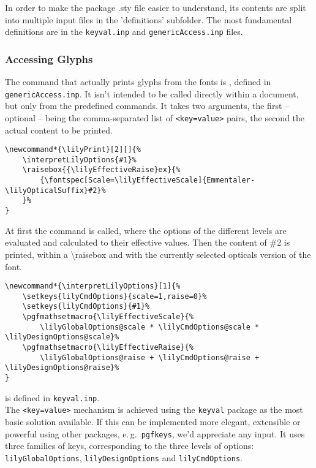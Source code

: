 \documentclass{article}
\begin{document}
\medskip
In order to make the package .sty file easier to understand, its contents are split into multiple input files in the 'definitions' subfolder. 
The most fundamental definitions are in the \texttt{keyval.inp} and \texttt{genericAccess.inp} files.

\subsubsection{Accessing \emmentaler Glyphs}
\label{subsubsec:accessing_emmentaler_glyphs}
The command that actually prints glyphs from the \emmentaler fonts is , defined in \texttt{genericAccess.inp}.
It isn't intended to be called directly within a document, but only from the predefined commands.
It takes two arguments, the first -- optional -- being the comma-separated list of \texttt{<key=value>} pairs, the second the actual content to be printed.

\begin{verbatim}
\newcommand*{\lilyPrint}[2][]{%
    \interpretLilyOptions{#1}%
    \raisebox{{\lilyEffectiveRaise}ex}{%
        {\fontspec[Scale=\lilyEffectiveScale]{Emmentaler-\lilyOpticalSuffix}#2}%
    }%
}
\end{verbatim}

At first the command  is called, where the options of the different levels are evaluated and calculated to their effective values.
Then the content of \#2 is printed, within a \textbackslash raisebox and with the currently selected opticals version of the \emmentaler font.

\begin{verbatim}
\newcommand*{\interpretLilyOptions}[1]{%
    \setkeys{lilyCmdOptions}{scale=1,raise=0}%
    \setkeys{lilyCmdOptions}{#1}%
    \pgfmathsetmacro{\lilyEffectiveScale}{%
        \lilyGlobalOptions@scale * \lilyCmdOptions@scale * \lilyDesignOptions@scale}%
    \pgfmathsetmacro{\lilyEffectiveRaise}{%
        \lilyGlobalOptions@raise + \lilyCmdOptions@raise + \lilyDesignOptions@raise}%
}
\end{verbatim}
 is defined in \texttt{keyval.inp}.\\
The \texttt{<key=value>} mechanism is achieved using the \texttt{keyval} package as the most basic solution available.
{\color{red} If this can be implemented more elegant, extensible or powerful using other packages, e.\,g.\ \texttt{pgfkeys}, we'd appreciate any input.}
It uses three families of keys, corresponding to the three levels of options:
\texttt{lilyGlobalOptions}, \texttt{lilyDesignOptions} and \texttt{lilyCmdOptions}.
\end{document}
